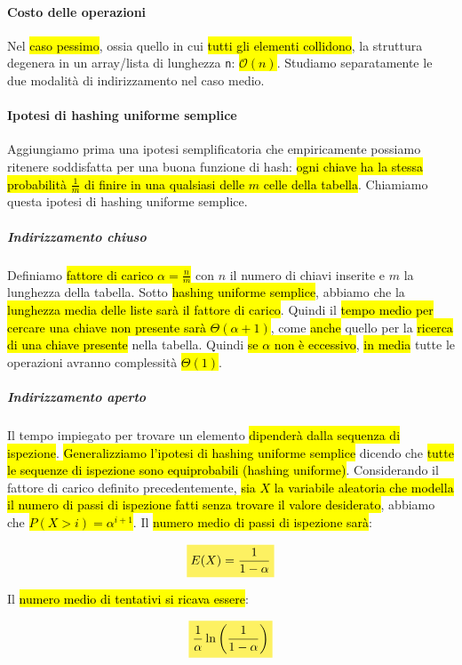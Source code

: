 \documentclass[a4paper,11pt,twoside]{article}
\theoremstyle{plain}
\theoremstyle{definition}
\theoremstyle{remark}
\newcommand{\mhl}[1]{\colorbox{hlcolor}{$\displaystyle #1$}}
\begin{document}
\paragraph{Costo delle operazioni} Nel \hl{caso pessimo}, ossia quello in cui
\hl{tutti gli elementi collidono}, la struttura degenera in un array/lista di
lunghezza \texttt{n}: \hl{$\mathcal{O}(n)$}. Studiamo separatamente le due
modalità di indirizzamento nel caso medio.

\paragraph{Ipotesi di hashing uniforme semplice} Aggiungiamo prima una ipotesi
semplificatoria che empiricamente possiamo ritenere soddisfatta per una buona
funzione di hash: \hl{ogni chiave ha la stessa probabilità $\frac{1}{m}$ di
finire in una qualsiasi delle $m$ celle della tabella}. Chiamiamo questa ipotesi
di hashing uniforme semplice.

\subparagraph{Indirizzamento chiuso} Definiamo \hl{fattore di carico $\alpha =
\frac{n}{m}$} con $n$ il numero di chiavi inserite e $m$ la lunghezza della
tabella. Sotto \hl{hashing uniforme semplice}, abbiamo che la \hl{lunghezza
media delle liste sarà il fattore di carico}. Quindi il \hl{tempo medio per
cercare una chiave non presente sarà $\Theta(\alpha + 1)$}, come \hl{anche}
quello per la \hl{ricerca di una chiave presente} nella tabella. Quindi \hl{se
$\alpha$ non è eccessivo}, \hl{in media} tutte le operazioni avranno complessità
\hl{$\Theta(1)$}.

\subparagraph{Indirizzamento aperto} Il tempo impiegato per trovare un elemento
\hl{dipenderà dalla sequenza di ispezione}. \hl{Generalizziamo l'ipotesi di
hashing uniforme semplice} dicendo che \hl{tutte le sequenze di ispezione sono
equiprobabili (hashing uniforme)}. Considerando il fattore di carico definito
precedentemente, \hl{sia $X$ la variabile aleatoria che modella il numero di passi
di ispezione fatti senza trovare il valore desiderato}, abbiamo che \hl{$P(X > i) = \alpha^{i+1}$}.
Il \hl{numero medio di passi di ispezione sarà}:

\begin{equation}
  \mhl{
    E(X) = \frac{1}{1-\alpha}
  }
\end{equation}

\noindent Il \hl{numero medio di tentativi si ricava essere}:

\begin{equation}
  \mhl{
    \frac{1}{\alpha}\ln\left(\frac{1}{1-\alpha}\right)
  }
\end{equation}
\end{document}
